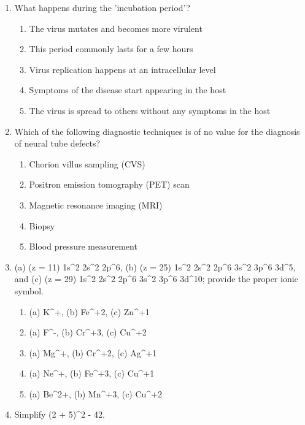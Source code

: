 \documentclass[12pt]{article}
\begin{document}
\begin{enumerate}[label=\arabic*.]
\begin{enumerate}[label=(\alph*)]
    \item a DNA or RNA primer and DNA polymerase
    \item a DNA or RNA primer and reverse transcriptase
    \item a RNA primer and DNA polymerase
\end{enumerate}
\item What happens during the 'incubation period'?
\begin{enumerate}[label=(\alph*)]
    \item The virus mutates and becomes more virulent
    \item This period commonly lasts for a few hours
    \item Virus replication happens at an intracellular level
    \item Symptoms of the disease start appearing in the host
    \item The virus is spread to others without any symptoms in the host
\end{enumerate}
\item Which of the following diagnostic techniques is of no value for the diagnosis of neural tube defects?
\begin{enumerate}[label=(\alph*)]
    \item Chorion villus sampling (CVS)
    \item Positron emission tomography (PET) scan
    \item Magnetic resonance imaging (MRI)
    \item Biopsy
    \item Blood pressure measurement
\end{enumerate}
\item (a) (z = 11) 1s\^{}2 2s\^{}2 2p\^{}6, (b) (z = 25) 1s\^{}2 2s\^{}2 2p\^{}6 3s\^{}2 3p\^{}6 3d\^{}5, and (c) (z = 29) 1s\^{}2 2s\^{}2 2p\^{}6 3s\^{}2 3p\^{}6 3d\^{}10; provide the proper ionic symbol.
\begin{enumerate}[label=(\alph*)]
    \item (a) K\^{}+, (b) Fe\^{}+2, (c) Zn\^{}+1
    \item (a) F\^{}-, (b) Cr\^{}+3, (c) Cu\^{}+2
    \item (a) Mg\^{}+, (b) Cr\^{}+2, (c) Ag\^{}+1
    \item (a) Ne\^{}+, (b) Fe\^{}+3, (c) Cu\^{}+1
    \item (a) Be\^{}2+, (b) Mn\^{}+3, (c) Cu\^{}+2
\end{enumerate}
\item Simplify (2 + 5)\^{}2 - 42.

\end{enumerate}
\end{document}
